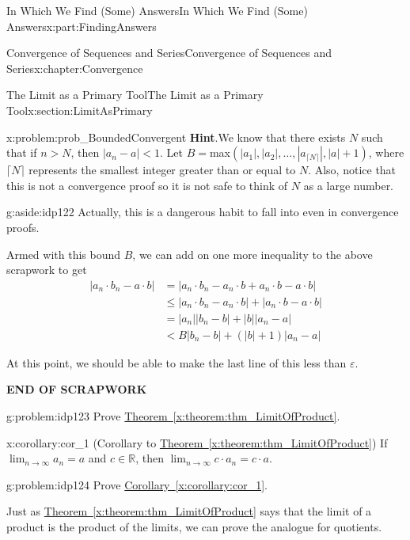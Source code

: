 \documentclass[oneside,10pt,]{book}
\newcommand{\blocktitlefont}{\relax}
\newcommand{\xreffont}{\relax}
\newcommand{\terminology}[1]{\textbf{#1}}
\numberwithin{equation}{section}
\newcommand{\abs}[1]{\left|#1\right|}
\newcommand{\eps}{\varepsilon}
\newcommand{\lt}{<}
\newcommand{\amp}{&}
\begin{document}
\begin{partptx}{In Which We Find (Some) Answers}{}{In Which We Find (Some) Answers}{}{}{x:part:FindingAnswers}
\begin{chapterptx}{Convergence of Sequences and Series}{}{Convergence of Sequences and Series}{}{}{x:chapter:Convergence}
\begin{sectionptx}{The Limit as a Primary Tool}{}{The Limit as a Primary Tool}{}{}{x:section:LimitAsPrimary}
\begin{problem}{}{x:problem:prob_BoundedConvergent}
\noindent\textbf{\blocktitlefont Hint}.\hypertarget{g:hint:idp121}{}\quad{}We know that there exists \(N\) such that if \(n>N\), then \(\abs{a_n-a}\lt 1\).  Let \(B=\)max\(\left(\abs{a_1},\abs{a_2},\ldots,\abs{a_{\lceil{N}\rceil}},\abs{a}+1\right)\), where \(\lceil{N}\rceil\) represents the smallest integer greater than or equal to \(N\).  Also, notice that this is not a convergence proof so it is not safe to think of \(N\) as a large number.%
\begin{aside}{}{g:aside:idp122}%
Actually, this is a dangerous habit to fall into even in convergence proofs.%
\end{aside}
\end{problem}
Armed with this bound \(B\), we can add on one more inequality to the above scrapwork to get%
\begin{align*}
\left|a_n\cdot b_n-a\cdot b\right|\amp =\left|a_n\cdot b_n-a_n\cdot b+a_n\cdot b-a\cdot b\right|\\
\amp \leq\left|a_n\cdot b_n-a_n\cdot b\right|+\left|a_n\cdot b-a\cdot b\right|\\
\amp =\left|a_n\right|\left|b_n-b\right|+\left|b\right|\left|a_n-a\right|\\
\amp \lt B\left|b_n-b\right|+\left(\left|b\right|+1\right)\left|a_n-a\right|
\end{align*}
%
\par
At this point, we should be able to make the last line of this less than \(\eps\).%
\par
\terminology{END OF SCRAPWORK}%
\begin{problem}{}{g:problem:idp123}%
 Prove \hyperref[x:theorem:thm_LimitOfProduct]{Theorem~{\xreffont\ref{x:theorem:thm_LimitOfProduct}}}.%
\end{problem}
\begin{corollary}{}{}{x:corollary:cor_1}%
(Corollary to \hyperref[x:theorem:thm_LimitOfProduct]{Theorem~{\xreffont\ref{x:theorem:thm_LimitOfProduct}}}) If \(\displaystyle\lim_{n\rightarrow\infty}a_n=a\) and \(c\in\mathbb{R}\), then \(\displaystyle\lim_{n\rightarrow\infty}c\cdot a_n=c\cdot a\).%
\end{corollary}
\begin{problem}{}{g:problem:idp124}%
 Prove  \hyperref[x:corollary:cor_1]{Corollary~{\xreffont\ref{x:corollary:cor_1}}}.%
\end{problem}
Just as \hyperref[x:theorem:thm_LimitOfProduct]{Theorem~{\xreffont\ref{x:theorem:thm_LimitOfProduct}}} says that the limit of a product is the product of the limits, we can prove the analogue for quotients.%

\end{sectionptx}
\end{chapterptx}
\end{partptx}
\end{document}
